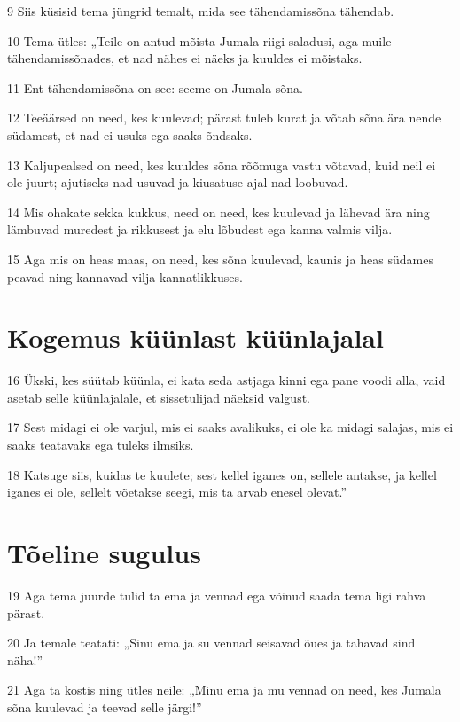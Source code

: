 \par 9 Siis küsisid tema jüngrid temalt, mida see tähendamissõna tähendab.
\par 10 Tema ütles: „Teile on antud mõista Jumala riigi saladusi, aga muile tähendamissõnades, et nad nähes ei näeks ja kuuldes ei mõistaks.
\par 11 Ent tähendamissõna on see: seeme on Jumala sõna.
\par 12 Teeäärsed on need, kes kuulevad; pärast tuleb kurat ja võtab sõna ära nende südamest, et nad ei usuks ega saaks õndsaks.
\par 13 Kaljupealsed on need, kes kuuldes sõna rõõmuga vastu võtavad, kuid neil ei ole juurt; ajutiseks nad usuvad ja kiusatuse ajal nad loobuvad.
\par 14 Mis ohakate sekka kukkus, need on need, kes kuulevad ja lähevad ära ning lämbuvad muredest ja rikkusest ja elu lõbudest ega kanna valmis vilja.
\par 15 Aga mis on heas maas, on need, kes sõna kuulevad, kaunis ja heas südames peavad ning kannavad vilja kannatlikkuses.

\section*{Kogemus küünlast küünlajalal}

\par 16 Ükski, kes süütab küünla, ei kata seda astjaga kinni ega pane voodi alla, vaid asetab selle küünlajalale, et sissetulijad näeksid valgust.
\par 17 Sest midagi ei ole varjul, mis ei saaks avalikuks, ei ole ka midagi salajas, mis ei saaks teatavaks ega tuleks ilmsiks.
\par 18 Katsuge siis, kuidas te kuulete; sest kellel iganes on, sellele antakse, ja kellel iganes ei ole, sellelt võetakse seegi, mis ta arvab enesel olevat.”

\section*{Tõeline sugulus}

\par 19 Aga tema juurde tulid ta ema ja vennad ega võinud saada tema ligi rahva pärast.
\par 20 Ja temale teatati: „Sinu ema ja su vennad seisavad õues ja tahavad sind näha!”
\par 21 Aga ta kostis ning ütles neile: „Minu ema ja mu vennad on need, kes Jumala sõna kuulevad ja teevad selle järgi!”


